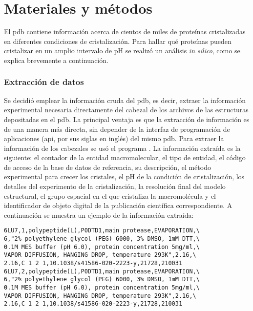 \chapter{Materiales y métodos}

El \acrshort{pdb} contiene información acerca de cientos de miles de proteínas cristalizadas en diferentes condiciones de cristalización. Para hallar qué proteínas pueden cristalizar en un amplio intervalo de pH se realizó un análisis \emph{in silico}, como se explica brevemente a continuación. 

\subsection{Extracción de datos}
Se decidió emplear la información cruda del \acrshort{pdb}, es decir, extraer la información experimental necesaria directamente del cabezal de los archivos de las estructuras depositadas en el \acrshort{pdb}. La principal ventaja es que la extracción de información es de una manera más directa, sin depender de la interfaz de programación de aplicaciones (\acrshort{api}, por sus siglas en inglés) del mismo \acrshort{pdb}. Para extraer la información de los cabezales se usó el programa . La información extraída es la siguiente: el contador de la entidad macromolecular, el tipo de entidad, el código de acceso de la base de datos de referencia, su descripción, el método experimental para crecer los cristales, el pH de la condición de cristalización, los detalles del experimento de la cristalización, la resolución final del modelo estructural, el grupo espacial en el que cristaliza la macromolécula y el identificador de objeto digital de la publicación científica correspondiente. A continuación se muestra un ejemplo de la información extraída:

\begin{kaobox}[frametitle=Ejemplo 1]
\begin{verbatim}
6LU7,1,polypeptide(L),P0DTD1,main protease,EVAPORATION,\
6,"2% polyethylene glycol (PEG) 6000, 3% DMSO, 1mM DTT,\
0.1M MES buffer (pH 6.0), protein concentration 5mg/ml,\
VAPOR DIFFUSION, HANGING DROP, temperature 293K",2.16,\
2.16,C 1 2 1,10.1038/s41586-020-2223-y,21728,210031
6LU7,2,polypeptide(L),P0DTD1,main protease,EVAPORATION,\
6,"2% polyethylene glycol (PEG) 6000, 3% DMSO, 1mM DTT,\
0.1M MES buffer (pH 6.0), protein concentration 5mg/ml,\
VAPOR DIFFUSION, HANGING DROP, temperature 293K",2.16,\
2.16,C 1 2 1,10.1038/s41586-020-2223-y,21728,210031
\end{verbatim}
\end{kaobox}

